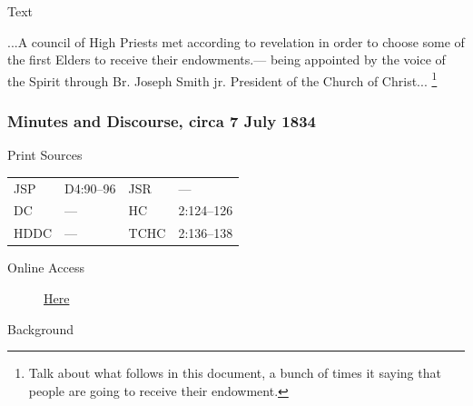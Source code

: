 				\begin{description}
					\item[Text]
				\end{description}
				
					...A council of High Priests met according to revelation in order to choose some of the first Elders to receive their endowments.--- being appointed by the voice of the Spirit through Br. Joseph Smith jr. President of the Church of Christ...%
						\footnote{%
							\label{EMS-1834-JS-23-JUN-1834-NOTE-explanation}%
							Talk about what follows in this document, a bunch of times it saying that people are going to receive their endowment.
							}
							
		\subsubsection{Minutes and Discourse, circa 7 July 1834}
			\label{EMS-1834-JS-7-JUL-1834}
			
			\begin{description}
					\item[Print Sources]
				\end{description}

					\begin{tabular}{p{0.5in}p{1in}p{0.5in}p{1in}}
					JSP	 	& D4:90--96		& JSR 		& --- \\
					DC	 	& --- 		& HC 		& 2:124--126 \\
					HDDC 	& ---		& TCHC 		& 2:136--138 \\
					\end{tabular}
				
				\begin{description}
					\item[Online Access] \href{https://www.josephsmithpapers.org/paper-summary/minutes-and-discourse-circa-7-july-1834/1}{Here}
				\end{description}
				
				\begin{description}
					\item[Background]
				\end{description}
				
				
